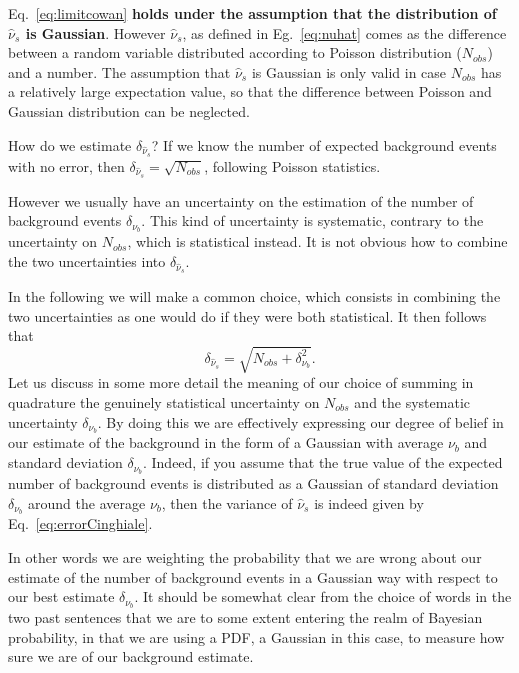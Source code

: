 \documentclass[a4paper,12pt]{article}
\begin{document}
Eq.~\ref{eq:limitcowan} {\bf holds under the assumption that the distribution of
$\hat{\nu}_s$ is Gaussian}. However $\hat{\nu}_s$, as defined in
Eg.~\ref{eq:nuhat} comes as the difference between a random variable
distributed according to Poisson distribution ($N_{obs}$) and a number. The
assumption that $\hat{\nu}_s$ is Gaussian is only valid in case $N_{obs}$
has a relatively large expectation value, so that the difference between
Poisson and Gaussian distribution can be neglected.

How do we estimate $\delta_{\hat{\nu}_s}$? If we know the number of
expected background events with no error, then
$\delta_{\hat{\nu}_s}=\sqrt{N_{obs}}$, following Poisson statistics. 

However we usually have an uncertainty on the estimation of the number of
background events $\delta_{\nu_b}$. This kind of uncertainty is systematic, contrary to the
uncertainty on $N_{obs}$, which is statistical instead. It is not obvious how
to combine the two uncertainties into $\delta_{\hat{\nu}_s}$.

In the following we will make a common choice, which consists in combining the
two uncertainties as one would do if they were both statistical. It then
follows that
\begin{equation}
\delta_{\hat{\nu}_s}=\sqrt{N_{obs}+\delta_{\nu_b}^{2}}.
\label{eq:errorCinghiale}
\end{equation}
Let us discuss in some more detail the meaning of our choice of summing in
quadrature the genuinely statistical uncertainty on $N_{obs}$ and the
systematic uncertainty $\delta_{\nu_b}$.
By doing this we are effectively expressing our degree of belief in our
estimate of the background in the form of a Gaussian with average $\nu_b$ and
standard deviation $\delta_{\nu_b}$. Indeed, if you assume that the true value
of the expected number of background events is distributed as a Gaussian of
standard deviation $\delta_{\nu_b}$ around the average $\nu_b$, then the
variance of $\hat{\nu}_s$ is indeed given by Eq.~\ref{eq:errorCinghiale}.

In other words we are weighting the probability that we are wrong about our
estimate of the number of background events in a Gaussian way
with respect to our best estimate $\delta_{\nu_b}$. It should be somewhat clear from the choice of words in
the two past sentences that we are to some extent entering the realm of
Bayesian probability, in that we are using a PDF, a Gaussian in this case, to
measure how sure we are of our background estimate.
\end{document}
